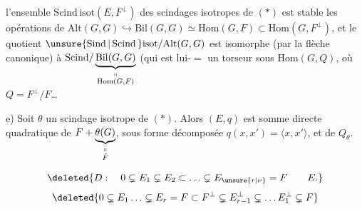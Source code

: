 l'ensemble $\mathrm{Scind}\,\mathrm{isot}(E,F^\perp)$ des scindages isotropes de $(*)$ est stable   les opérations de $\mathrm{Alt}(G,G)\hookrightarrow\mathrm{Bil}(G,G)\simeq\mathrm{Hom}(G,F)\subset\mathrm{Hom}(G,F^\perp)$, et le quotient $\unsure{\mathrm{Sind}\,|\,\mathrm{Scind}\,}\mathrm{isot}/\mathrm{Alt}(G,G)$ est isomorphe (par la flèche canonique) à $\mathrm{Scind}/\underbrace{\mathrm{Bil}(G,G)}_{\substack{\shortparallel\\\mathrm{Hom}(G,F)}}$ (qui est lui-$=$ un torseur sous $\mathrm{Hom}(G,Q)$, où $Q=F^\perp/F$\ldots

 e) Soit $\theta$ un scindage isotrope de $(*)$. Alors $(E,q)$ est somme directe quadratique de $F+\underbrace{\theta(G)}_{\substack{\shortparallel\\\check F}}$,    sous forme décomposée $q(x,x')=\langle x,x'\rangle$, et de $Q_\theta$.

\[
\deleted{D:\quad0\subsetneq E_1\subsetneq E_2\subset\ldots\subsetneq E_{\unsure{r|\nu}}=F\qquad E.}
\]
\[
\deleted{0\subsetneq E_1\ldots\subsetneq E_r=F\subset F^\perp\subsetneq E_{r-1}^{\perp}\subsetneq\ldots E_1^\perp\subsetneq F}
\]
